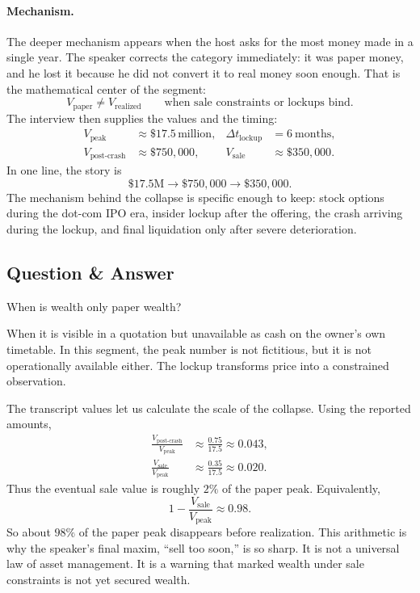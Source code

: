 \paragraph{Mechanism.}
The deeper mechanism appears when the host asks for the most money made in a single year. The speaker corrects the category immediately: it was paper money, and he lost it because he did not convert it to real money soon enough. That is the mathematical center of the segment:
\begin{equation}
V_{\text{paper}} \neq V_{\text{realized}}
\qquad
\text{when sale constraints or lockups bind.}
\end{equation}
The interview then supplies the values and the timing:
\begin{align}
V_{\text{peak}} &\approx \$17.5\,\text{million},&
\Delta t_{\text{lockup}} &= 6\ \text{months},\\
V_{\text{post-crash}} &\approx \$750{,}000,&
V_{\text{sale}} &\approx \$350{,}000.
\end{align}
In one line, the story is
\begin{equation}
\$17.5\text{M} \longrightarrow \$750{,}000 \longrightarrow \$350{,}000.
\end{equation}
The mechanism behind the collapse is specific enough to keep: stock options during the dot-com IPO era, insider lockup after the offering, the crash arriving during the lockup, and final liquidation only after severe deterioration.

\subsection{Question \& Answer}

When is wealth only paper wealth?

When it is visible in a quotation but unavailable as cash on the owner's own timetable. In this segment, the peak number is not fictitious, but it is not operationally available either. The lockup transforms price into a constrained observation.

The transcript values let us calculate the scale of the collapse. Using the reported amounts,
\begin{align}
\frac{V_{\text{post-crash}}}{V_{\text{peak}}}
&\approx \frac{0.75}{17.5}
\approx 0.043,\\
\frac{V_{\text{sale}}}{V_{\text{peak}}}
&\approx \frac{0.35}{17.5}
\approx 0.020.
\end{align}
Thus the eventual sale value is roughly \(2\%\) of the paper peak. Equivalently,
\begin{equation}
1-\frac{V_{\text{sale}}}{V_{\text{peak}}} \approx 0.98.
\end{equation}
So about \(98\%\) of the paper peak disappears before realization. This arithmetic is why the speaker's final maxim, ``sell too soon,'' is so sharp. It is not a universal law of asset management. It is a warning that marked wealth under sale constraints is not yet secured wealth.


